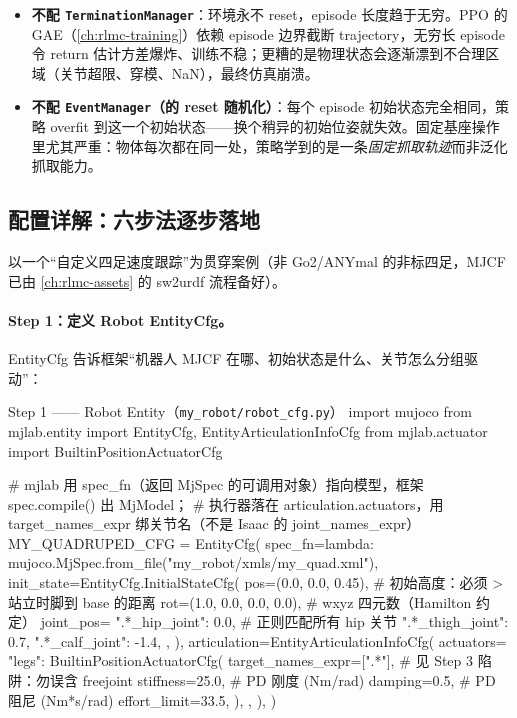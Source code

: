 \begin{itemize}
\item \textbf{不配 \texttt{TerminationManager}}：环境永不 reset，episode 长度趋于无穷。PPO 的 GAE（\cref{ch:rlmc-training}）依赖 episode 边界截断 trajectory，无穷长 episode 令 return 估计方差爆炸、训练不稳；更糟的是物理状态会逐渐漂到不合理区域（关节超限、穿模、NaN），最终仿真崩溃。
\item \textbf{不配 \texttt{EventManager}（的 reset 随机化）}：每个 episode 初始状态完全相同，策略 overfit 到这一个初始状态——换个稍异的初始位姿就失效。固定基座操作里尤其严重：物体每次都在同一处，策略学到的是一条\emph{固定抓取轨迹}而非泛化抓取能力。
\end{itemize}

\subsection{配置详解：六步法逐步落地}
\label{sec:rlmc-diy-mjlab-sixstep}

以一个“自定义四足速度跟踪”为贯穿案例（非 Go2/ANYmal 的非标四足，MJCF 已由 \cref{ch:rlmc-assets} 的 sw2urdf 流程备好）。

\paragraph{Step 1：定义 Robot EntityCfg。}EntityCfg 告诉框架“机器人 MJCF 在哪、初始状态是什么、关节怎么分组驱动”：

\begin{codebox}[Python]{Step 1 —— Robot Entity（\texttt{my\_robot/robot\_cfg.py}）}
import mujoco
from mjlab.entity import EntityCfg, EntityArticulationInfoCfg
from mjlab.actuator import BuiltinPositionActuatorCfg

# mjlab 用 spec_fn（返回 MjSpec 的可调用对象）指向模型，框架 spec.compile() 出 MjModel；
# 执行器落在 articulation.actuators，用 target_names_expr 绑关节名（不是 Isaac 的 joint_names_expr）
MY_QUADRUPED_CFG = EntityCfg(
    spec_fn=lambda: mujoco.MjSpec.from_file("my_robot/xmls/my_quad.xml"),
    init_state=EntityCfg.InitialStateCfg(
        pos=(0.0, 0.0, 0.45),                 # 初始高度：必须 > 站立时脚到 base 的距离
        rot=(1.0, 0.0, 0.0, 0.0),             # wxyz 四元数（Hamilton 约定）
        joint_pos={
            ".*_hip_joint":   0.0,            # 正则匹配所有 hip 关节
            ".*_thigh_joint": 0.7,
            ".*_calf_joint":  -1.4,
        },
    ),
    articulation=EntityArticulationInfoCfg(
        actuators={
            "legs": BuiltinPositionActuatorCfg(
                target_names_expr=[".*"],     # 见 Step 3 陷阱：勿误含 freejoint
                stiffness=25.0,               # PD 刚度 (Nm/rad)
                damping=0.5,                  # PD 阻尼 (Nm*s/rad)
                effort_limit=33.5,
            ),
        },
    ),
)
\end{codebox}

